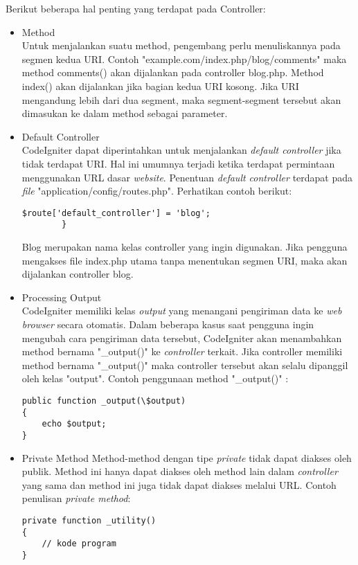 	Berikut beberapa hal penting yang terdapat pada Controller:
	\begin{itemize}
		\item Method \\
		Untuk menjalankan suatu method, pengembang perlu menuliskannya pada segmen kedua URI. Contoh "example.com/index.php/blog/comments" maka method comments() akan dijalankan pada controller blog.php. Method index() akan dijalankan jika bagian kedua URI kosong. Jika URI mengandung lebih dari dua segment, maka segment-segment tersebut akan dimasukan ke dalam method sebagai parameter.
		
		\item Default Controller \\
		CodeIgniter dapat diperintahkan untuk menjalankan \textit{default controller} jika tidak terdapat URI. Hal ini umumnya terjadi ketika  terdapat permintaan menggunakan URL dasar \textit{website}. Penentuan \textit{default controller} terdapat pada \textit{file} "application/config/routes.php". Perhatikan contoh berikut:
		\begin{lstlisting}[backgroundcolor = \color{lightgray}]
$route['default_controller'] = 'blog';
		}
		\end{lstlisting} 
		Blog merupakan nama kelas controller yang ingin digunakan. Jika pengguna mengakses file index.php utama tanpa menentukan segmen URI, maka akan dijalankan controller blog.
		
		\item Processing Output \\
		CodeIgniter memiliki kelas \textit{output} yang menangani pengiriman data ke \textit{web browser} secara otomatis. Dalam beberapa kasus saat pengguna ingin mengubah cara pengiriman data tersebut, CodeIgniter akan menambahkan method bernama "\_output()" ke \textit{controller} terkait. Jika controller memiliki method bernama "\_output()" maka controller tersebut akan selalu dipanggil oleh kelas "output".
		Contoh penggunaan method "\_output()" : 
		\begin{lstlisting}[backgroundcolor = \color{lightgray}]
public function _output(\$output)
{
	echo $output;
}
		\end{lstlisting}
		
		\item Private Method
		Method-method dengan tipe \textit{private} tidak dapat diakses oleh publik. Method ini hanya dapat diakses oleh method lain dalam \textit{controller} yang sama dan method ini juga tidak dapat diakses melalui URL. Contoh penulisan \textit{private method}:
		\begin{lstlisting}[backgroundcolor = \color{lightgray}]
private function _utility()
{
	// kode program
}
		\end{lstlisting}
		

\end{itemize}
